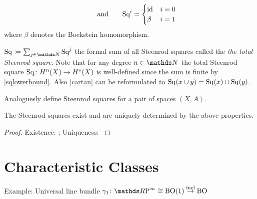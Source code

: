 \begin{Def}
\begin{description}
\begin{gather}
      \qquad\text{and}\qquad
      \text{Sq}^{i} = \begin{cases}
        \mathrm{id}_{} & i=0\\
        \beta & i=1
      \end{cases}
    \end{gather}
     where $\beta$ denotes the Bockstein homomorphism. %
  \end{description}
  $\Sq{}\coloneqq \sum_{j\in\Nat}\Sq j$ the formal sum of all
  Steenrod squares called the \emph{the total Steenrod square}.
  Note that for any degree $n\in\Nat$ the total Steenrod square
  $\text{Sq}^{}\colon H^n(X)\to H^*(X)$ is well-defined since the sum is
  finite by \eqref{sqlowerbound}.
  Also \ref{cartan} can be reformulated to
  $\text{Sq}^{}(x\cup y) = \text{Sq}^{}(x)\cup\text{Sq}^{}(y)$.

  Analoguesly define Steenrod squares for a pair of spaces $(X,A)$.
\end{Def}

\begin{Thm}
  The Steenrod squares exist and are uniquely determined by the above
  properties.
  \begin{proof} %
    Existence: \cite[Chapter 2]{mosher};
    Uniqueness: \cite[VIII §3]{steenrodepstein}
  \end{proof}
\end{Thm}

\section{Characteristic Classes}
\begin{Def} %
  Example: Universal line bundle $\gamma_1\colon \RP\cong\BO(1) \overset\incl\to \BO$
\end{Def}

